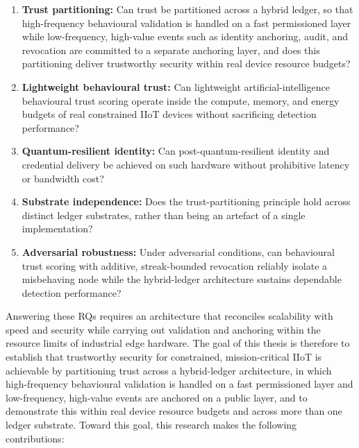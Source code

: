 \begin{enumerate}
  \item \textbf{Trust partitioning:} Can trust be partitioned across a hybrid
        ledger, so that high-frequency behavioural validation is handled on a
        fast permissioned layer while low-frequency, high-value events such as
        identity anchoring, audit, and revocation are committed to a separate
        anchoring layer, and does this partitioning deliver trustworthy security
        within real device resource budgets?

  \item \textbf{Lightweight behavioural trust:} Can lightweight
        artificial-intelligence behavioural trust scoring operate inside the
        compute, memory, and energy budgets of real constrained IIoT devices
        without sacrificing detection performance?

  \item \textbf{Quantum-resilient identity:} Can post-quantum-resilient identity
        and credential delivery be achieved on such hardware without prohibitive
        latency or bandwidth cost?

  \item \textbf{Substrate independence:} Does the trust-partitioning principle
        hold across distinct ledger substrates, rather than being an artefact of
        a single implementation?

  \item \textbf{Adversarial robustness:} Under adversarial conditions, can
        behavioural trust scoring with additive, streak-bounded revocation
        reliably isolate a misbehaving node while the hybrid-ledger architecture
        sustains dependable detection performance?
\end{enumerate}

Answering these RQs requires an architecture that reconciles scalability
with speed and security while carrying out validation and anchoring within the
resource limits of industrial edge hardware. The goal of this thesis is
therefore to establish that trustworthy security for constrained,
mission-critical IIoT is achievable by partitioning trust across a hybrid-ledger
architecture, in which high-frequency behavioural validation is handled on a
fast permissioned layer and low-frequency, high-value events are anchored on a
public layer, and to demonstrate this within real device resource budgets and
across more than one ledger substrate. Toward this goal, this research makes the
following contributions:

